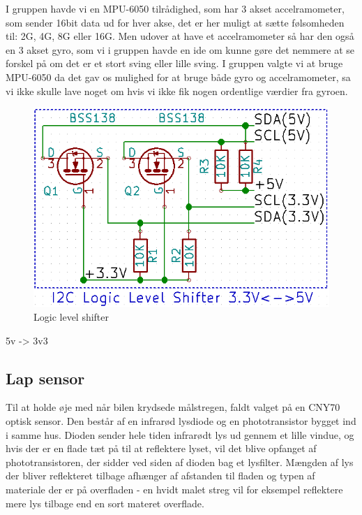 I gruppen havde vi en MPU-6050 tilrådighed, som har 3 akset accelramometer, som sender 16bit data ud for hver akse, det er her muligt at sætte følsomheden til: \textpm 2G, 4G, 8G eller 16G. Men udover at have et accelramometer så har den også en 3 akset gyro, som vi i gruppen havde en ide om kunne gøre det nemmere at se forskel på om det er et stort sving eller  lille sving. I gruppen valgte vi at bruge MPU-6050 da det gav os mulighed for at bruge både gyro og accelramometer, sa vi ikke skulle lave noget om hvis vi ikke fik nogen ordentlige værdier fra gyroen.
\linebreak

\begin{figure}[h]\centering
	\includegraphics[scale=0.4]{Billeder/LogicLevelShifter.png}
	\caption{Logic level shifter}
	\label{fig:LogiLevelShifter}
\end{figure}
5v -> 3v3

\subsection{Lap sensor}

Til at holde øje med når bilen krydsede målstregen, faldt valget på en CNY70 optisk sensor. Den består af en infrarød lysdiode og en phototransistor bygget ind i samme hus. Dioden sender hele tiden infrarødt lys ud gennem et lille vindue, og hvis der er en flade tæt på til at reflektere lyset, vil det blive opfanget af phototransistoren, der sidder ved siden af dioden bag et lysfilter. Mængden af lys der bliver reflekteret tilbage afhænger af afstanden til fladen og typen af materiale der er på overfladen - en hvidt malet streg vil for eksempel reflektere mere lys tilbage end en sort materet overflade.

